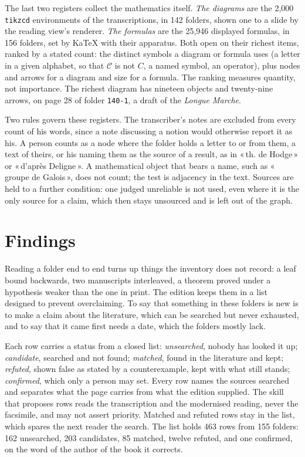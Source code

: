 \documentclass[11pt]{article}
\newcommand{\q}[1]{«\,#1\,»}
\begin{document}
The last two registers collect the mathematics itself. \emph{The diagrams} are the 2,000 \texttt{tikzcd} environments of the transcriptions, in 142 folders, shown one to a slide by the reading view's renderer. \emph{The formulas} are the 25,946 displayed formulas, in 156 folders, set by KaTeX with their apparatus. Both open on their richest items, ranked by a stated count: the distinct symbols a diagram or formula uses (a letter in a given alphabet, so that \(\mathcal{C}\) is not \(C\), a named symbol, an operator), plus nodes and arrows for a diagram and size for a formula. The ranking measures quantity, not importance. The richest diagram has nineteen objects and twenty-nine arrows, on page 28 of folder \texttt{140-1}, a draft of the \emph{Longue Marche}.

Two rules govern these registers. The transcriber's notes are excluded from every count of his words, since a note discussing a notion would otherwise report it as his. A person counts as a node where the folder holds a letter to or from them, a text of theirs, or his naming them as the source of a result, as in \q{th. de Hodge} or \q{d'après Deligne}. A mathematical object that bears a name, such as \q{groupe de Galois}, does not count; the test is adjacency in the text. Sources are held to a further condition: one judged unreliable is not used, even where it is the only source for a claim, which then stays unsourced and is left out of the graph.

\section{Findings}

Reading a folder end to end turns up things the inventory does not record: a leaf bound backwards, two manuscripts interleaved, a theorem proved under a hypothesis weaker than the one in print. The edition keeps them in a list designed to prevent overclaiming. To say that something in these folders is new is to make a claim about the literature, which can be searched but never exhausted, and to say that it came first needs a date, which the folders mostly lack.

Each row carries a status from a closed list: \emph{unsearched}, nobody has looked it up; \emph{candidate}, searched and not found; \emph{matched}, found in the literature and kept; \emph{refuted}, shown false as stated by a counterexample, kept with what still stands; \emph{confirmed}, which only a person may set. Every row names the sources searched and separates what the page carries from what the edition supplied. The skill that proposes rows reads the transcription and the modernised reading, never the facsimile, and may not assert priority. Matched and refuted rows stay in the list, which spares the next reader the search. The list holds 463 rows from 155 folders: 162 unsearched, 203 candidates, 85 matched, twelve refuted, and one confirmed, on the word of the author of the book it corrects.
\end{document}

